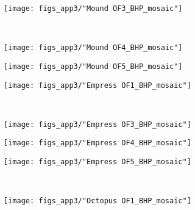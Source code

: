 \newpage

\begin{figure}[h]\ContinuedFloat
    \begin{subfigure}[b]{\linewidth}
        \texttt{[image: figs\_app3/"Mound OF3\_BHP\_mosaic"]}
        \label{fig:MS3_degform}
    \end{subfigure}\\[-4ex]
    \begin{subfigure}[b]{\linewidth}
    	\texttt{[image: figs\_app3/"Mound OF4\_BHP\_mosaic"]}
        \label{fig:MS4_degform}
    \end{subfigure}
\end{figure}

\newpage

\begin{figure}[h]\ContinuedFloat
    \begin{subfigure}[b]{\linewidth}
        \texttt{[image: figs\_app3/"Mound OF5\_BHP\_mosaic"]}
        \label{fig:MS5_degform}
    \end{subfigure}
    \begin{subfigure}[b]{\linewidth}
        \texttt{[image: figs\_app3/"Empress OF1\_BHP\_mosaic"]}
        \label{fig:EP1_degform}
    \end{subfigure}\\[-4ex]
\end{figure}

\newpage

\begin{figure}[h]\ContinuedFloat
    \begin{subfigure}[b]{\linewidth}
        \texttt{[image: figs\_app3/"Empress OF3\_BHP\_mosaic"]}
        \label{fig:EP3_degform}
    \end{subfigure}
    \begin{subfigure}[b]{\linewidth}
        \texttt{[image: figs\_app3/"Empress OF4\_BHP\_mosaic"]}
        \label{fig:EP4_degform}
    \end{subfigure}
\end{figure}

\newpage

\begin{figure}[h]\ContinuedFloat
    \begin{subfigure}[b]{\linewidth}
    	\texttt{[image: figs\_app3/"Empress OF5\_BHP\_mosaic"]}
        \label{fig:EP5_degform}
    \end{subfigure}\\[-4ex]
    \begin{subfigure}[b]{\linewidth}
        \texttt{[image: figs\_app3/"Octopus OF1\_BHP\_mosaic"]}
        \label{fig:OS1_degform}
    \end{subfigure}
\end{figure}

